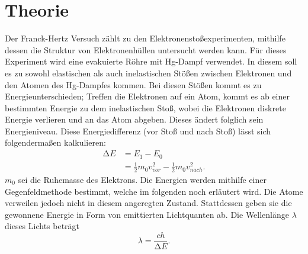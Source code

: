 \section{Theorie}
\label{sec:Theorie}

Der Franck-Hertz Versuch zählt zu den Elektronenstoßexperimenten, mithilfe 
dessen die Struktur von Elektronenhüllen untersucht werden kann. Für dieses 
Experiment wird eine evakuierte Röhre mit Hg-Dampf verwendet. In diesem soll 
es zu sowohl elastischen als auch inelastischen Stößen zwischen Elektronen 
und den Atomen des Hg-Dampfes kommen. Bei diesen Stößen kommt es zu 
Energieunterschieden; Treffen die Elektronen auf ein Atom, kommt es ab einer 
bestimmten Energie zu dem inelastischen Stoß, wobei die Elektronen diskrete 
Energie verlieren und an das Atom abgeben. Dieses ändert folglich sein 
Energieniveau. Diese Energiedifferenz (vor Stoß und nach Stoß) lässt sich 
folgendermaßen kalkulieren:
\begin{align}
    \label{eqn:1}
    \increment E &= E_1 -E_0 \\
                 &= \frac{1}{2} m_0 v_{vor}^2 - \frac{1}{2} m_0 v_{nach}^2.
\end{align}
\noindent $m_0$ sei die Ruhemasse des Elektrons. Die Energien werden mithilfe 
einer Gegenfeldmethode bestimmt, welche im folgenden noch erläutert wird.
Die Atome verweilen jedoch nicht in diesem angeregten Zustand. Stattdessen 
geben sie die gewonnene Energie in Form von emittierten Lichtquanten ab. Die 
Wellenlänge $\lambda$ dieses Lichts beträgt
\begin{equation}
    \label{eqn:lambda}
    \lambda = \frac{ch}{\increment E}.
\end{equation}

